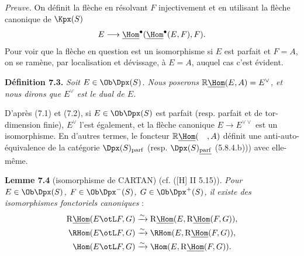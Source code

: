 \emph{Preuve.} On définit la flèche en résolvant \(F\) injectivement et en utilisant la flèche canonique de \(\Kpx(S)\)
\[
  E\longrightarrow\underline{\Hom}^\bullet(\underline{\Hom}^\bullet(E,F),F).
\]
Pour voir que la flèche en question est un isomorphisme si \(E\) est parfait et \(F=A\), on se ramène, par localisation et dévissage, à \(E=A\), auquel cas c'est évident.

\textbf{Définition 7.3.} \emph{Soit \(E\in\Ob\Dpx(S)\). Nous poserons \(\mathbb{R}\underline{\Hom}(E,A)=E^\vee\), et nous dirons que \(E^\vee\) est le dual de \(E\).}

D'après (7.1) et (7.2), si \(E\in\Ob\Dpx(S)\) est parfait (resp. parfait et de tor-dimension finie), \(E^\vee\) l'est également, et la flèche canonique \(E\to E^{\vee\vee}\) est un isomorphisme. En d'autres termes, le foncteur \(\mathbb{R}\underline{\Hom}(\quad,A)\) définit une anti-auto-équivalence de la catégorie \(\Dpx(S)_{\mathrm{parf}}\) (resp. \(\Dpx(S)_{\underline{\mathrm{parf}}}\) (5.8.4.b))) avec elle-même.

\textbf{Lemme 7.4} (isomorphisme de CARTAN) (cf. ([H] II 5.15)). \emph{Pour \(E\in\Ob\Dpx(S)\), \(F\in\Ob\Dpx^-(S)\), \(G\in\Ob\Dpx^+(S)\), il existe des isomorphismes fonctoriels canoniques} :
\[
\begin{aligned}
\mathrm R\underline{\Hom}(E\otL F,G)&\xrightarrow{\sim}\mathrm R\underline{\Hom}(E,\mathrm R\underline{\Hom}(F,G)),\\
\RHom(E\otL F,G)&\xrightarrow{\sim}\RHom(E,\mathrm R\underline{\Hom}(F,G)),\\
\Hom(E\otL F,G)&\xrightarrow{\sim}\Hom(E,\mathrm R\underline{\Hom}(F,G)).
\end{aligned}
\]

